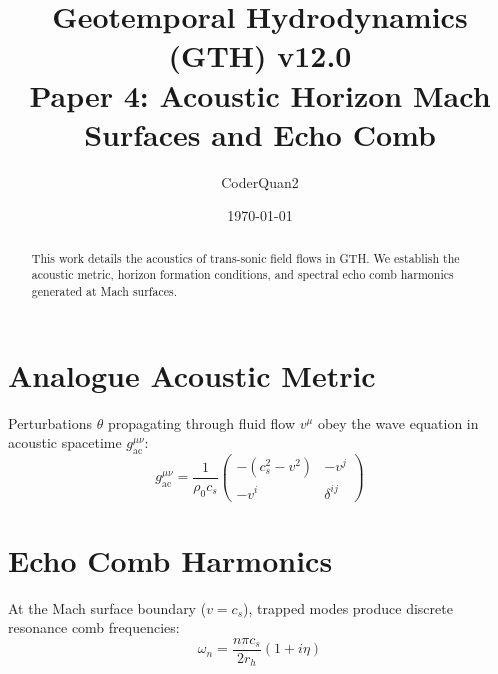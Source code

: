 \documentclass[11pt,a4paper]{article}
\title{\textbf{Geotemporal Hydrodynamics (GTH) v12.0\\Paper 4: Acoustic Horizon Mach Surfaces and Echo Comb}}
\author{CoderQuan2}
\date{\today}
\begin{document}
\maketitle
\begin{abstract}
This work details the acoustics of trans-sonic field flows in GTH. We establish the acoustic metric, horizon formation conditions, and spectral echo comb harmonics generated at Mach surfaces.
\end{abstract}
\section{Analogue Acoustic Metric}
Perturbations $\theta$ propagating through fluid flow $v^\mu$ obey the wave equation in acoustic spacetime $g^{\mu\nu}_{\text{ac}}$:
\begin{equation}
g^{\mu\nu}_{\text{ac}} = \frac{1}{\rho_0 c_s} \begin{pmatrix} -(c_s^2 - v^2) & -v^j \\ -v^i & \delta^{ij} \end{pmatrix}
\end{equation}
\section{Echo Comb Harmonics}
At the Mach surface boundary ($v = c_s$), trapped modes produce discrete resonance comb frequencies:
\begin{equation}
\omega_n = \frac{n \pi c_s}{2 r_h} \left( 1 + i \eta \right)
\end{equation}
\end{document}
